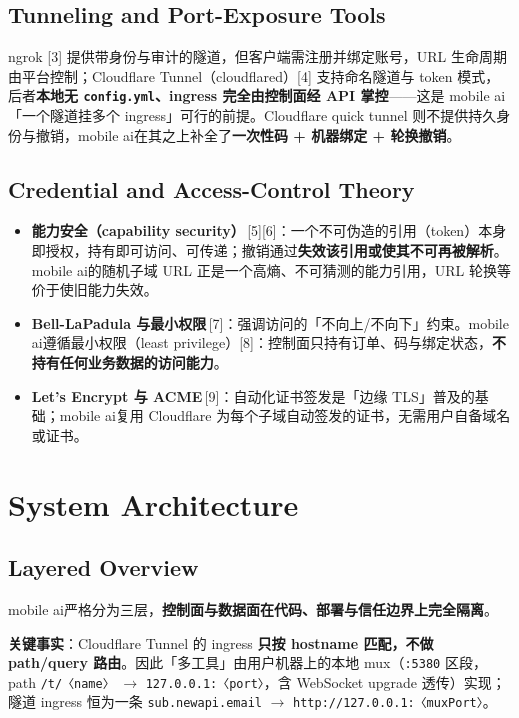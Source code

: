 \documentclass[10pt,a4paper]{article}
\newcommand{\diagramfile}[1]{%
  \par\noindent\centering
  {\ttfamily\cjktt\tiny}%
  \par\vspace{0.5em}
}
\newcommand{\sys}{mobile ai}
\begin{document}
\subsection{Tunneling and Port-Exposure Tools}
ngrok [3] 提供带身份与审计的隧道，但客户端需注册并绑定账号，URL 生命周期由平台控制；Cloudflare Tunnel（cloudflared）[4] 支持命名隧道与 token 模式，后者\textbf{本地无 \texttt{config.yml}、ingress 完全由控制面经 API 掌控}——这是 \sys「一个隧道挂多个 ingress」可行的前提。Cloudflare quick tunnel 则不提供持久身份与撤销，\sys 在其之上补全了\textbf{一次性码 + 机器绑定 + 轮换撤销}。

\subsection{Credential and Access-Control Theory}
\begin{itemize}[leftmargin=1.6em,itemsep=0.2em,topsep=0.2em]
  \item \textbf{能力安全（capability security）}\,[5][6]：一个不可伪造的引用（token）本身即授权，持有即可访问、可传递；撤销通过\textbf{失效该引用或使其不可再被解析}。\sys 的随机子域 URL 正是一个高熵、不可猜测的能力引用，URL 轮换等价于使旧能力失效。
  \item \textbf{Bell-LaPadula 与最小权限}\,[7]：强调访问的「不向上/不向下」约束。\sys 遵循最小权限（least privilege）[8]：控制面只持有订单、码与绑定状态，\textbf{不持有任何业务数据的访问能力}。
  \item \textbf{Let's Encrypt 与 ACME}\,[9]：自动化证书签发是「边缘 TLS」普及的基础；\sys 复用 Cloudflare 为每个子域自动签发的证书，无需用户自备域名或证书。
\end{itemize}

\section{System Architecture}

\subsection{Layered Overview}
\sys 严格分为三层，\textbf{控制面与数据面在代码、部署与信任边界上完全隔离}。

\diagramfile{diagram-en.verbatim}



\noindent\textbf{关键事实}：Cloudflare Tunnel 的 ingress \textbf{只按 hostname 匹配，不做 path/query 路由}。因此「多工具」由用户机器上的本地 mux（\texttt{:5380} 区段，path \texttt{/t/〈name〉} $\rightarrow$ \texttt{127.0.0.1:〈port〉}，含 WebSocket upgrade 透传）实现；隧道 ingress 恒为一条 \texttt{sub.newapi.email} $\rightarrow$ \texttt{http://127.0.0.1:〈muxPort〉}。
\end{document}
